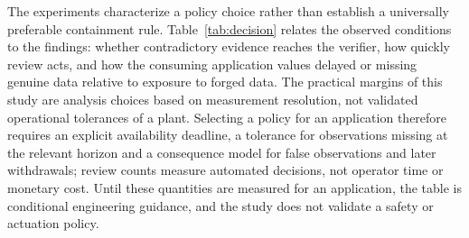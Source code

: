 \documentclass[futureinternet,article,submit,moreauthors]{Definitions/mdpi}
\begin{document}
The experiments characterize a policy choice rather than establish a universally preferable containment rule. Table~\ref{tab:decision} relates the observed conditions to the findings: whether contradictory evidence reaches the verifier, how quickly review acts, and how the consuming application values delayed or missing genuine data relative to exposure to forged data. The practical margins of this study are analysis choices based on measurement resolution, not validated operational tolerances of a plant. Selecting a policy for an application therefore requires an explicit availability deadline, a tolerance for observations missing at the relevant horizon and a consequence model for false observations and later withdrawals; review counts measure automated decisions, not operator time or monetary cost. Until these quantities are measured for an application, the table is conditional engineering guidance, and the study does not validate a safety or actuation policy.
\end{document}
